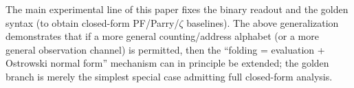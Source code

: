 \begin{remark}
The main experimental line of this paper fixes the binary readout and the golden syntax (to obtain closed-form PF/Parry/$\zeta$ baselines). The above generalization demonstrates that if a more general counting/address alphabet (or a more general observation channel) is permitted, then the ``folding = evaluation + Ostrowski normal form'' mechanism can in principle be extended; the golden branch is merely the simplest special case admitting full closed-form analysis.
\end{remark}


